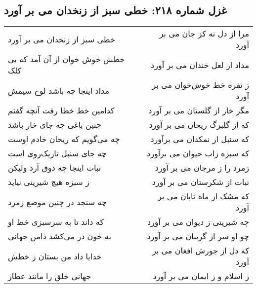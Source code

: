 \begin{center}
\section*{غزل شماره ۲۱۸: خطی سبز از زنخدان می بر آورد}
\label{sec:218}
\begin{longtable}{l p{0.5cm} r}
خطی سبز از زنخدان می بر آورد
&&
مرا از دل نه کز جان می بر آورد
\\
خطش خوش خوان از آن آمد که بی کلک
&&
مداد از لعل خندان می بر آورد
\\
مداد اینجا چه باشد لوح سیمش
&&
ز نقره خط خوش‌خوان می بر آورد
\\
کدامین خط خطا رفت آنچه گفتم
&&
مگر خار از گلستان می بر آورد
\\
چنین باغی چه جای خار باشد
&&
که از گلبرگ ریحان می بر آورد
\\
چه می‌گویم که ریحان خادم اوست
&&
که سنبل از نمکدان می برآورد
\\
چه جای سنبل تاریک‌روی است
&&
که سبزه زاب حیوان می برآورد
\\
نبات اینجا چه ذوق آرد ولیکن
&&
زمرد را ز مرجان می بر آورد
\\
ز سبزه هیچ شیرینی نیاید
&&
نبات از شکرستان می بر آورد
\\
چه سنجد در چنین موضع زمرد
&&
که مشک از ماه تابان می بر آورد
\\
که داند تا به سرسبزی خط او
&&
چه شیرینی ز دیوان می بر آورد
\\
به خون در می‌کشد دامن جهانی
&&
چو او سر از گریبان می بر آورد
\\
خدایا داد من بستان ز خطش
&&
که دل از جورش افغان می بر آورد
\\
جهانی خلق را مانند عطار
&&
ز اسلام و ز ایمان می بر آورد
\\
\end{longtable}
\end{center}
